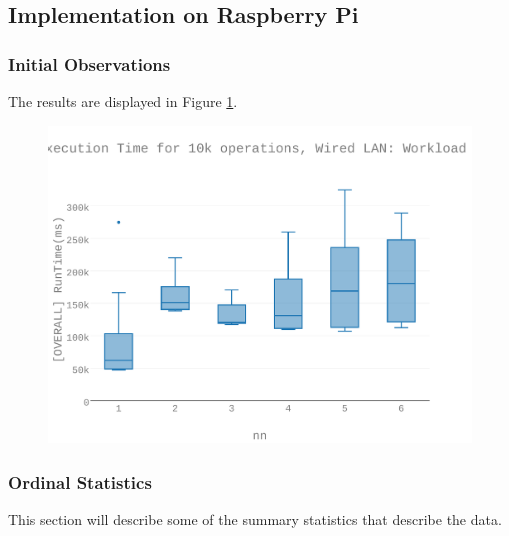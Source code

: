 \subsection{Implementation on Raspberry Pi}
\subsubsection{Initial Observations}
The results are displayed in Figure \ref{figures-wli_fig10}.  \begin{figure}[h]
\includegraphics[width=5.5in]{Figures/figures-wli_fig10.pdf}
\caption{}
\label{figures-wli_fig10}
\end{figure}



\subsubsection{Ordinal Statistics}
This section will describe some of the summary statistics that describe the data.  

